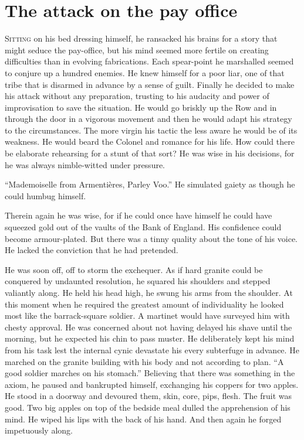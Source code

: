 \chapter*{\textsf{The attack on the pay office}}

S\textsc{itting} on his bed dressing himself, he ransacked his brains for a story that might seduce the pay-office, but his mind seemed more fertile on creating difficulties than in evolving fabrications. Each spear-point he marshalled seemed to conjure up a hundred enemies. He knew himself for a poor liar, one of that tribe that is disarmed in advance by a sense of guilt. Finally he decided to make his attack without any preparation, trusting to his audacity and power of improvisation to save the situation. He would go briskly up the Row and in through the door in a vigorous movement and then he would adapt his strategy to the circumstances. The more virgin his tactic the less aware he would be of its weakness. He would beard the Colonel and romance for his life. How could there be elaborate rehearsing for a stunt of that sort? He was wise in his decisions, for he was always nimble-witted under pressure.

``Mademoiselle from Armenti\`{e}res, Parley Voo.'' He simulated gaiety as though he could humbug himself.

Therein again he was wise, for if he could once have himself he could have squeezed gold out of the vaults of the Bank of England. His confidence could become armour-plated. But there was a tinny quality about the tone of his voice. He lacked the conviction that he had pretended.

He was soon off, off to storm the exchequer. As if hard granite could be conquered by undaunted resolution, he squared his shoulders and stepped valiantly along. He held his head high, he swung his arms from the shoulder. At this moment when he required the greatest amount of individuality he looked most like the barrack-square soldier. A martinet would have surveyed him with chesty approval. He was concerned about not having delayed his shave until the morning, but he expected his chin to pass muster. He deliberately kept his mind from his task lest the internal cynic devastate his every subterfuge in advance. He marched on the granite building with his body and not according to plan. ``A good soldier marches on his stomach.'' Believing that there was something in the axiom, he paused and bankrupted himself, exchanging his coppers for two apples. He stood in a doorway and devoured them, skin, core, pips, flesh. The fruit was good. Two big apples on top of the bedside meal dulled the apprehension of his mind. He wiped his lips with the back of his hand. And then again he forged impetuously along.

